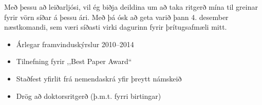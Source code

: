 \documentclass{cover}
\begin{document}
{Með þessu að leiðarljósi, vil ég biðja deildina um að taka ritgerð mína til 
greinar fyrir vörn síðar á þessu ári. Með þá ósk að geta varið þann 4. desember 
næstkomandi, sem væri síðasti virki dagurinn fyrir þrítugsafmæli mitt. 

}{}{
\begin{itemize}
    \item Árlegar framvinduskýrslur 2010--2014
    \item Tilnefning fyrir ,,Best Paper Award``
    \item Staðfest yfirlit frá nemendaskrá yfir þreytt námskeið 
    \item Drög að doktorsritgerð (þ.m.t. fyrri birtingar)
\end{itemize}
}
\end{document}
